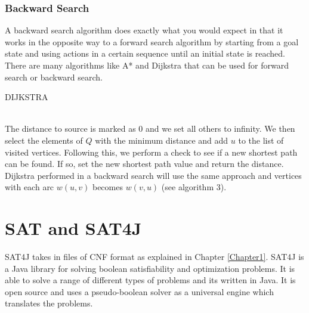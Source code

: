 \subsubsection{Backward Search}
A backward search algorithm does exactly what you would expect in that it works in the opposite way to a forward search algorithm by starting from a goal state and using actions in a certain sequence until an initial state is reached. 
There are many algorithms like A* and Dijkstra that can be used for forward search or backward search.
\\ 
\begin{algorithm}
\caption{DIJKSTRA}
\end{algorithm}
\\
The distance to source is marked as 0 and we set all others to infinity. We then select the elements of $Q$ with the minimum distance and add $u$ to the list of visited vertices. Following this, we perform a check to see if a new shortest path can be found. If so, set the new shortest path value and return the distance. 
Dijkstra performed in a backward search will use the same approach and vertices with each arc $w(u, v)$ becomes $w(v, u)$ (see algorithm 3).
\section{SAT and SAT4J} 
SAT4J takes in files of CNF format as explained in Chapter \ref{Chapter1}. SAT4J is a Java library for solving boolean satisfiability and optimization problems\cite{SATandSAT4J}. It is able to solve a range of different types of problems and its written in Java. It is open source and uses a pseudo-boolean solver as a universal engine which translates the problems\cite{SATandSAT4J}. 

